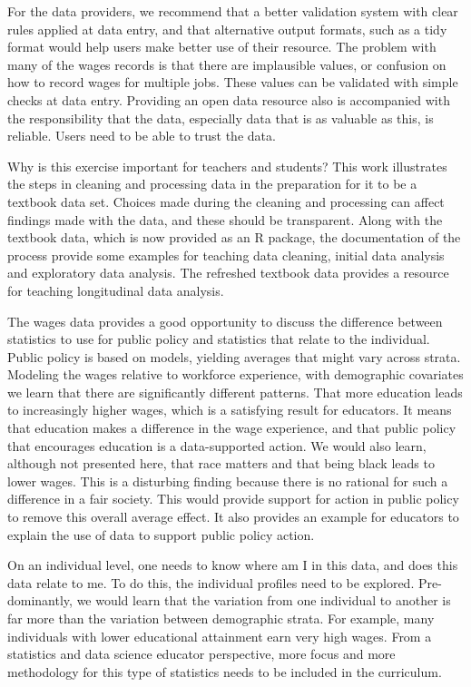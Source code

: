 \documentclass{article}
\begin{document}
For the data providers, we recommend that a better validation system with clear rules applied at data entry, and that alternative output formats, such as a tidy format would help users make better use of their resource. The problem with many of the wages records is that there are implausible values, or confusion on how to record wages for multiple jobs. These values can be validated with simple checks at data entry. Providing an open data resource also is accompanied with the responsibility that the data, especially data that is as valuable as this, is reliable. Users need to be able to trust the data.

Why is this exercise important for teachers and students? This work illustrates the steps in cleaning and processing data in the preparation for it to be a textbook data set. Choices made during the cleaning and processing can affect findings made with the data, and these should be transparent. Along with the textbook data, which is now provided as an R package, the documentation of the process provide some examples for teaching data cleaning, initial data analysis and exploratory data analysis. The refreshed textbook data provides a resource for teaching longitudinal data analysis.

The wages data provides a good opportunity to discuss the difference between statistics to use for public policy and statistics that relate to the individual. Public policy is based on models, yielding averages that might vary across strata. Modeling the wages relative to workforce experience, with demographic covariates we learn that there are significantly different patterns. That more education leads to increasingly higher wages, which is a satisfying result for educators. It means that education makes a difference in the wage experience, and that public policy that encourages education is a data-supported action. We would also learn, although not presented here, that race matters and that being black leads to lower wages. This is a disturbing finding because there is no rational for such a difference in a fair society. This would provide support for action in public policy to remove this overall average effect. It also provides an example for educators to explain the use of data to support public policy action.

On an individual level, one needs to know where am I in this data, and does this data relate to me. To do this, the individual profiles need to be explored. Pre-dominantly, we would learn that the variation from one individual to another is far more than the variation between demographic strata. For example, many individuals with lower educational attainment earn very high wages. From a statistics and data science educator perspective, more focus and more methodology for this type of statistics needs to be included in the curriculum.
\end{document}
